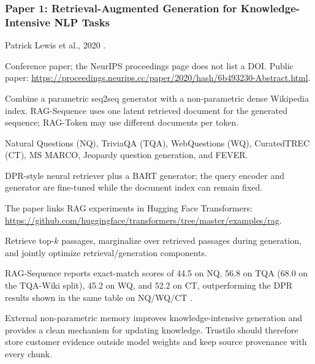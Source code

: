 \documentclass[11pt,journal,onecolumn]{IEEEtran}
\begin{document}
\subsubsection{Paper 1: Retrieval-Augmented Generation for Knowledge-Intensive NLP Tasks}
\begin{description}[leftmargin=3.25cm,style=nextline]
\item[Authors / Year] Patrick Lewis et al., 2020 \cite{lewis2020rag}.
\item[DOI / Link] Conference paper; the NeurIPS proceedings page does not list a DOI. Public paper: \url{https://proceedings.neurips.cc/paper/2020/hash/6b493230-Abstract.html}.
\item[Main idea] Combine a parametric seq2seq generator with a non-parametric dense Wikipedia index. RAG-Sequence uses one latent retrieved document for the generated sequence; RAG-Token may use different documents per token.
\item[Datasets] Natural Questions (NQ), TriviaQA (TQA), WebQuestions (WQ), CuratedTREC (CT), MS MARCO, Jeopardy question generation, and FEVER.
\item[Models] DPR-style neural retriever plus a BART generator; the query encoder and generator are fine-tuned while the document index can remain fixed.
\item[Code] The paper links RAG experiments in Hugging Face Transformers: \url{https://github.com/huggingface/transformers/tree/master/examples/rag}.
\item[Procedure / tricks] Retrieve top-$k$ passages, marginalize over retrieved passages during generation, and jointly optimize retrieval/generation components.
\item[Metrics / results] RAG-Sequence reports exact-match scores of 44.5 on NQ, 56.8 on TQA (68.0 on the TQA-Wiki split), 45.2 on WQ, and 52.2 on CT, outperforming the DPR results shown in the same table on NQ/WQ/CT \cite{lewis2020rag}.
\item[Key learning] External non-parametric memory improves knowledge-intensive generation and provides a clean mechanism for updating knowledge. Trustilo should therefore store customer evidence outside model weights and keep source provenance with every chunk.
\end{description}
\end{document}
